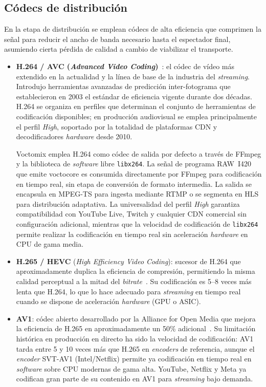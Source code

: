 \subsection{Códecs de distribución}

En la etapa de distribución se emplean códecs de alta eficiencia que comprimen la señal
para reducir el ancho de banda necesario hasta el espectador final, asumiendo cierta
pérdida de calidad a cambio de viabilizar el transporte.

\begin{itemize}
  \item \textbf{H.264 / AVC (\textit{Advanced Video Coding})}~\cite{itu_h264}:
  el códec de vídeo más extendido en la actualidad y la línea de base de la industria
  del \textit{streaming}. Introdujo herramientas avanzadas de predicción inter-fotograma que
  establecieron en 2003 el estándar de eficiencia vigente durante dos décadas. H.264
  se organiza en perfiles que determinan el conjunto de herramientas de codificación
  disponibles; en producción audiovisual se emplea principalmente el perfil \textit{High},
  soportado por la totalidad de plataformas CDN y decodificadores \textit{hardware} desde 2010.

  Voctomix emplea H.264 como códec de salida por defecto a través de FFmpeg y la
  biblioteca de \textit{software} libre \texttt{libx264}. La señal de programa RAW~I420 que
  emite voctocore es consumida directamente por FFmpeg para codificación en tiempo real,
  sin etapa de conversión de formato intermedia. La salida se encapsula en MPEG-TS para
  ingesta mediante RTMP o se segmenta en HLS para distribución adaptativa. La
  universalidad del perfil \textit{High} garantiza compatibilidad con YouTube Live,
  Twitch y cualquier CDN comercial sin configuración adicional, mientras que la
  velocidad de codificación de \texttt{libx264} permite realizar la codificación en
  tiempo real sin aceleración \textit{hardware} en CPU de gama media.

  \item \textbf{H.265 / HEVC} (\textit{High Efficiency Video Coding}): sucesor de
  H.264 que aproximadamente duplica la eficiencia de compresión, permitiendo la misma
  calidad perceptual a la mitad del \textit{bitrate}~\cite{itu_h265}. Su codificación es 5--8
  veces más lenta que H.264, lo que lo hace adecuado para \textit{streaming} en tiempo real
  cuando se dispone de aceleración \textit{hardware} (\ac{GPU} o \ac{ASIC}).

  \item \textbf{AV1}: códec abierto desarrollado por la Alliance for Open Media que
  mejora la eficiencia de H.265 en aproximadamente un 50\% adicional~\cite{chen2024_codec_comparison}.
  Su limitación histórica en producción en directo ha sido la velocidad de codificación:
  AV1 tarda entre 5 y 10 veces más que H.265 en \textit{encoders} de referencia, aunque el
  \textit{encoder} SVT-AV1 (Intel/Netflix) permite ya codificación en tiempo real en \textit{software}
  sobre CPU modernas de gama alta. YouTube, Netflix y Meta ya codifican gran parte
  de su contenido en AV1 para \textit{streaming} bajo demanda.


\end{itemize}
